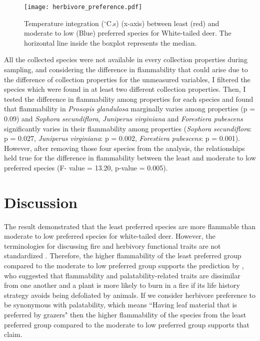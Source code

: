 \documentclass[12pt]{report}
\begin{document}
\begin{figure}
    \centering
    \texttt{[image: herbivore\_preference.pdf]}
    \caption{Temperature integration ($^{\circ}$C.s) (x-axis) between least (red) and moderate to low (Blue) preferred species for White-tailed deer. The horizontal line inside the boxplot represents the median.}   
\end{figure}

All the collected species were not available in every collection properties during sampling, and considering the difference in flammability that could arise due to the difference of collection properties for the unmeasured variables, I filtered the species which were found in at least two different collection properties. Then, I tested the difference in flammability among properties for each species and found that flammability in \emph{Prosopis glandulosa} marginally varies among properties (p = 0.09) and \emph{Sophora secundiflora}, \emph{Juniperus virginiana} and \emph{Forestiera pubescens} significantly varies in their flammability among properties (\emph{Sophora secundiflora}: p = 0.027, \emph{Juniperus virginiana}: p = 0.002, \emph{Forestiera pubescens}: p = 0.001). However, after removing those four species from the analysis, the relationships held true for the difference in flammability between the least and moderate to low preferred species (F- value = 13.20, p-value = 0.005).

\section{Discussion}

The result demonstrated that the least preferred species are more flammable than moderate to low preferred species for white-tailed deer. However, the terminologies for discussing fire and herbivory functional traits are not standardized \citep{archibald2019unified}. Therefore, the higher flammability of the least preferred group compared to the moderate to low preferred group supports the prediction by \citep{archibald2019unified}, who suggested that flammability and palatability-related traits are dissimilar from one another and a plant is more likely to burn in a fire if its life history strategy avoids being defoliated by animals. If we consider herbivore preference to be synonymous with palatability, which means ``Having leaf material that is preferred by grazers" \citep{archibald2019unified} then the higher flammability of the species from the least preferred group compared to the moderate to low preferred group supports that claim.
\end{document}
